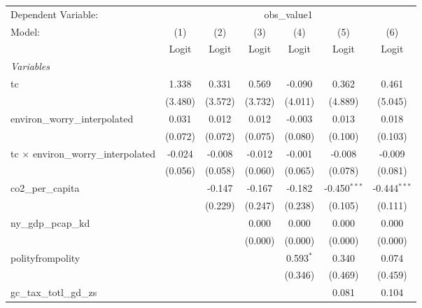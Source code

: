 
\begingroup
\centering
\begin{tabular}{lcccccc}
   \toprule
   Dependent Variable: & \multicolumn{6}{c}{obs\_value1}\\
   Model:                                      & (1)     & (2)     & (3)     & (4)         & (5)            & (6)\\  
                                               &  Logit  & Logit   & Logit   & Logit       & Logit          & Logit\\  
   \midrule
   \emph{Variables}\\
   tc                                          & 1.338   & 0.331   & 0.569   & -0.090      & 0.362          & 0.461\\   
                                               & (3.480) & (3.572) & (3.732) & (4.011)     & (4.889)        & (5.045)\\   
   environ\_worry\_interpolated                & 0.031   & 0.012   & 0.012   & -0.003      & 0.013          & 0.018\\   
                                               & (0.072) & (0.072) & (0.075) & (0.080)     & (0.100)        & (0.103)\\   
   tc $\times$ environ\_worry\_interpolated    & -0.024  & -0.008  & -0.012  & -0.001      & -0.008         & -0.009\\   
                                               & (0.056) & (0.058) & (0.060) & (0.065)     & (0.078)        & (0.081)\\   
   co2\_per\_capita                            &         & -0.147  & -0.167  & -0.182      & -0.450$^{***}$ & -0.444$^{***}$\\   
                                               &         & (0.229) & (0.247) & (0.238)     & (0.105)        & (0.111)\\   
   ny\_gdp\_pcap\_kd                           &         &         & 0.000   & 0.000       & 0.000          & 0.000\\   
                                               &         &         & (0.000) & (0.000)     & (0.000)        & (0.000)\\   
   polityfrompolity                            &         &         &         & 0.593$^{*}$ & 0.340          & 0.074\\   
                                               &         &         &         & (0.346)     & (0.469)        & (0.459)\\   
   gc\_tax\_totl\_gd\_zs                       &         &         &         &             & 0.081          & 0.104\\   

\end{tabular}
